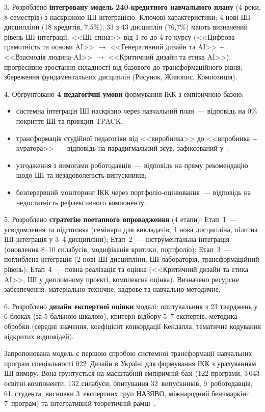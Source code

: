 3. Розроблено \textbf{інтегровану модель 240-кредитного навчального плану} (4 роки, 8 семестрів) з наскрізною ШІ-інтеграцією. Ключові характеристики: 4 нові ШІ-дисципліни (18 кредитів, 7,5\%); 33 з 43 дисциплін (76,7\%) мають визначений рівень ШІ-інтеграції; <<ШІ-спіна>> від 1-го до 4-го курсу (<<Цифрова грамотність та основи AI>> $\to$ <<Генеративний дизайн та AI>> + <<Взаємодія людина-AI>> $\to$ <<Критичний дизайн та етика AI>>); прогресивне зростання складності від базового до трансформаційного рівня; збереження фундаментальних дисциплін (Рисунок, Живопис, Композиція).

4. Обґрунтовано \textbf{4 педагогічні умови} формування ІКК з емпіричною базою:
\begin{itemize}
    \item системна інтеграція ШІ наскрізно через навчальний план~--- відповідь на 0\% покриття ШІ та принцип TPACK;
    \item трансформація студійної педагогіки від <<виробника>> до <<виробника + куратора>>~--- відповідь на парадигмальний зсув, зафіксований у~\cite{Musiienko2026ScopingReview};
    \item узгодження з вимогами роботодавців~--- відповідь на пряму рекомендацію щодо ШІ та незадоволеність випускників;
    \item безперервний моніторинг ІКК через портфоліо-оцінювання~--- відповідь на недостатність рефлексивного компоненту.
\end{itemize}

5. Розроблено \textbf{стратегію поетапного впровадження} (4 етапи): Етап~1~--- усвідомлення та підготовка (семінари для викладачів, 1 нова дисципліна, пілотна ШІ-інтеграція у 3--4 дисципліни); Етап~2~--- інструментальна інтеграція (оновлення 8--10 силабусів, модифікація критики, портфоліо); Етап~3~--- поглиблена інтеграція (2 нові ШІ-дисципліни, ШІ-лабораторія, трансформаційний рівень); Етап~4~--- повна реалізація та оцінка (<<Критичний дизайн та етика AI>>, ШІ у дипломному проєкті, комплексна оцінка). Визначено ресурсне забезпечення: матеріально-технічне, кадрове та навчально-методичне.

6. Розроблено \textbf{дизайн експертної оцінки} моделі: опитувальник з 23 тверджень у 6 блоках (за 5-бальною шкалою), критерії відбору 5--7 експертів, методика обробки (середні значення, коефіцієнт конкордації Кендалла, тематичне кодування відкритих відповідей).

Запропонована модель є першою спробою системної трансформації навчальних програм спеціальності 022~Дизайн в Україні для формування ІКК з урахуванням ШІ-виміру. Вона ґрунтується на масштабній емпіричній базі (122 програми, 3\,043 освітні компоненти, 132 силабуси, опитування 32~випускників, 9~роботодавців, 61~студента, висновки 3~експертних груп НАЗЯВО, міжнародний бенчмаркінг 7~програм) та інтегративній теоретичній рамці~\cite{Musiienko2026ScopingReview, Musiienko2025DesignEducation}.
